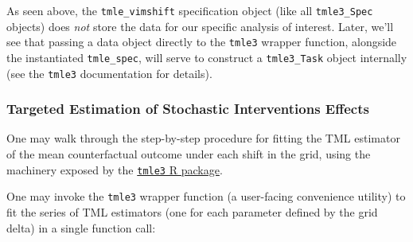 \documentclass[12pt, krantz2,]{krantz}
\theoremstyle{definition}
\theoremstyle{definition}
\theoremstyle{definition}
\newcommand{\1}{\mathbbm{1}}
\begin{document}
As seen above, the \texttt{tmle\_vimshift} specification object (like all \texttt{tmle3\_Spec}
objects) does \emph{not} store the data for our specific analysis of interest. Later,
we'll see that passing a data object directly to the \texttt{tmle3} wrapper function,
alongside the instantiated \texttt{tmle\_spec}, will serve to construct a \texttt{tmle3\_Task}
object internally (see the \texttt{tmle3} documentation for details).

\hypertarget{targeted-estimation-of-stochastic-interventions-effects-1}{%
\subsubsection{Targeted Estimation of Stochastic Interventions Effects}\label{targeted-estimation-of-stochastic-interventions-effects-1}}

One may walk through the step-by-step procedure for fitting the TML estimator
of the mean counterfactual outcome under each shift in the grid, using the
machinery exposed by the \href{https://tmle3.tlverse.org/}{\texttt{tmle3} R package}.

One may invoke the \texttt{tmle3} wrapper function (a user-facing convenience utility)
to fit the series of TML estimators (one for each parameter defined by the grid
delta) in a single function call:
\end{document}
